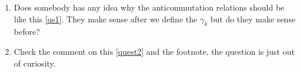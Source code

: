 \begin{enumerate}
    \item Does somebody has any idea why the anticommutation relations should be like this \ref{qs1}. They make sense after we define the $\gamma_k$ but do they make sense before?
    \item Check the comment on this \ref{quest2} and the footnote, the question is just out of curiosity.
\end{enumerate}